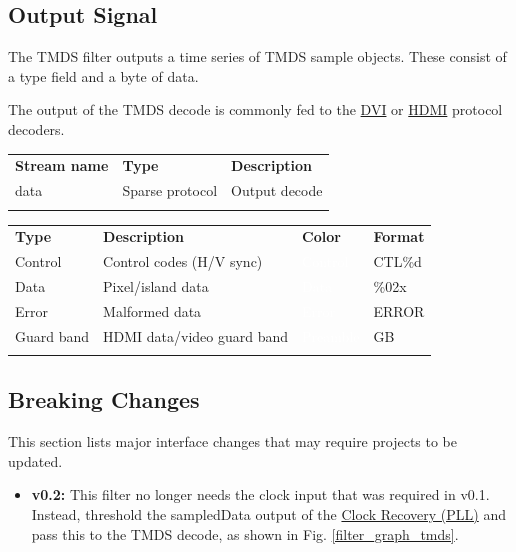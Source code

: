 \subsection{Output Signal}

The TMDS filter outputs a time series of TMDS sample objects. These consist of a type field and a byte of data.

The output of the TMDS decode is commonly fed to the \hyperref[filter:dvi]{DVI} or \hyperref[filter:hdmi]{HDMI}
protocol decoders.

\begin{tabularx}{16cm}{llX}
\thickhline
\textbf{Stream name} & \textbf{Type} & \textbf{Description} \\
\thickhline
data & Sparse protocol & Output decode \\
\thickhline
\end{tabularx}

\begin{tabularx}{16cm}{lllX}
\thickhline
\textbf{Type} & \textbf{Description} & \textbf{Color} & \textbf{Format} \\
\thickhline
Control & Control codes (H/V sync) & \cellcolor{control}\textcolor{white}{Control} & CTL\%d \\
\thinhline
Data & Pixel/island data & \cellcolor{data}\textcolor{white}{Data} & \%02x \\
\thinhline
Error & Malformed data & \cellcolor{error}\textcolor{white}{Error} & ERROR \\
\thinhline
Guard band & HDMI data/video guard band & \cellcolor{preamble}\textcolor{white}{Preamble} & GB \\
\thickhline
\end{tabularx}

\subsection{Breaking Changes}

This section lists major interface changes that may require projects to be updated.

\begin{itemize}
\item \textbf{v0.2:} This filter no longer needs the clock input that was required in v0.1.
Instead, threshold the sampledData output of the \hyperref[filter:cdrpll]{Clock Recovery (PLL)} and pass this to the
TMDS decode, as shown in Fig. \ref{filter_graph_tmds}.
\end{itemize}

